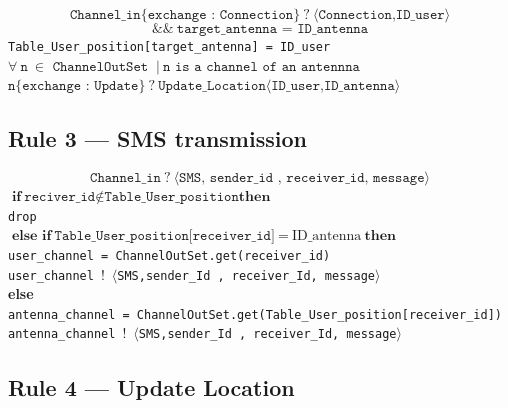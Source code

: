 \documentclass[a4paper,11pt]{article}
\begin{document}
\[
\texttt{Channel\_in}\{\texttt{exchange : Connection}\}\ ?\ \langle\texttt{Connection,ID\_user}\rangle
\]
\[
\&\&\ \texttt{target\_antenna = ID\_antenna}
\]
\hspace*{3em}\texttt{Table\_User\_position[target\_antenna] = ID\_user}\\
\hspace*{3em}$\forall\ \texttt{n}\ \in \texttt{ ChannelOutSet }\ |\ \texttt{n is a channel of an antennna} $\\
\hspace*{6em}$\texttt{n}\{\texttt{exchange : Update}\}\ ?\ \texttt{Update\_Location}\langle\texttt{ID\_user,ID\_antenna}\rangle $

\subsection*{Rule 3 — SMS transmission}

\[
\texttt{Channel\_in}\ ?\ \langle\texttt{SMS, sender\_id , receiver\_id, message}\rangle
\]
\hspace*{3em}$\textbf{if}\ \texttt{reciver\_id} \notin \texttt{Table\_User\_position} \textbf{then}$\\
\hspace*{6em}\texttt{drop}\\
\hspace*{3em}$\textbf{else if}\ \texttt{Table\_User\_position[receiver\_id]}\ =\ \text{ID\_antenna}\ \textbf{then}$\\
\hspace*{6em}\texttt{user\_channel = ChannelOutSet.get(receiver\_id)}\\
\hspace*{6em}\texttt{user\_channel}\ $!$\ \texttt{$\langle$SMS,sender\_Id , receiver\_Id, message$\rangle$}\\
\hspace*{3em}\textbf{else}\\
\hspace*{6em}\texttt{antenna\_channel = ChannelOutSet.get(Table\_User\_position[receiver\_id])}\\
\hspace*{6em}\texttt{antenna\_channel}\ $!$\ \texttt{$\langle$SMS,sender\_Id , receiver\_Id, message$\rangle$}

\subsection*{Rule 4 — Update Location}
\end{document}
